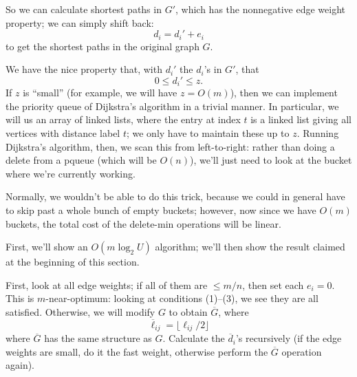 \documentclass{article}
\begin{document}
So we can calculate shortest paths in $G'$, which has the nonnegative
edge weight property; we can simply shift back:
$$
d_i = d_i' + e_i
$$
to get the shortest paths in the original graph $G$.

We have the nice property that, with $d_i'$ the $d_i$'s in $G'$, that
$$
0\leq d_i' \leq z.
$$
If $z$ is ``small'' (for example, we will have $z = O(m)$), then we can 
implement the priority queue of
Dijkstra's algorithm in a trivial manner.
In particular, we will us an array of linked lists, where the entry at
index $t$ is a linked list giving all vertices with distance label $t$;
we only have to maintain these up to $z$.
Running Dijkstra's algorithm, then, we scan this from left-to-right: 
rather than doing a delete from a pqueue (which will be $O(n)$), we'll
just need to look at the bucket where we're currently working.

Normally, we wouldn't be able to do this trick, because we could in general
have to skip past a whole bunch of empty buckets; however, now since we
have $O(m)$ buckets, the total cost of the delete-min operations will be
linear.

First, we'll show an $O(m\log_2 U)$ algorithm; we'll then show the result
claimed at the beginning of this section.

First, look at all edge weights; if all of them are $\leq m/n$, then set
each $e_i= 0$.
This is $m$-near-optimum: looking at conditions (1)--(3), we see they
are all satisfied.
Otherwise, we will modify $G$ to obtain $\overline G$, where
$$
\overline\ell_{ij} = \lfloor \ell_{ij} / 2\rfloor
$$
where $\overline G$ has the same structure as $G$.
Calculate the $\overline d_i$'s recursively (if the edge weights
are small, do it the fast weight, otherwise perform the $\overline G$
operation again).
\end{document}

